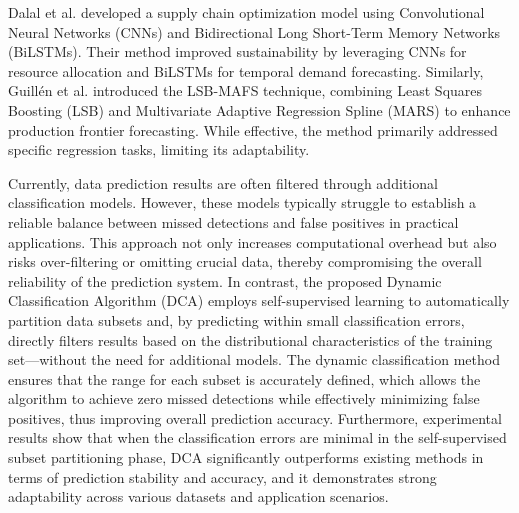 Dalal et al. \cite{dalal2023} developed a supply chain optimization model using Convolutional Neural Networks (CNNs) and Bidirectional Long Short-Term Memory Networks (BiLSTMs). Their method improved sustainability by leveraging CNNs for resource allocation and BiLSTMs for temporal demand forecasting. Similarly, Guillén et al. \cite{guillen2023} introduced the LSB-MAFS technique, combining Least Squares Boosting (LSB) and Multivariate Adaptive Regression Spline (MARS) to enhance production frontier forecasting. While effective, the method primarily addressed specific regression tasks, limiting its adaptability.

Currently, data prediction results are often filtered through additional classification models. However, these models typically struggle to establish a reliable balance between missed detections and false positives in practical applications. This approach not only increases computational overhead but also risks over-filtering or omitting crucial data, thereby compromising the overall reliability of the prediction system. In contrast, the proposed Dynamic Classification Algorithm (DCA) employs self-supervised learning to automatically partition data subsets and, by predicting within small classification errors, directly filters results based on the distributional characteristics of the training set—without the need for additional models. The dynamic classification method ensures that the range for each subset is accurately defined, which allows the algorithm to achieve zero missed detections while effectively minimizing false positives, thus improving overall prediction accuracy. Furthermore, experimental results show that when the classification errors are minimal in the self-supervised subset partitioning phase, DCA significantly outperforms existing methods in terms of prediction stability and accuracy, and it demonstrates strong adaptability across various datasets and application scenarios.